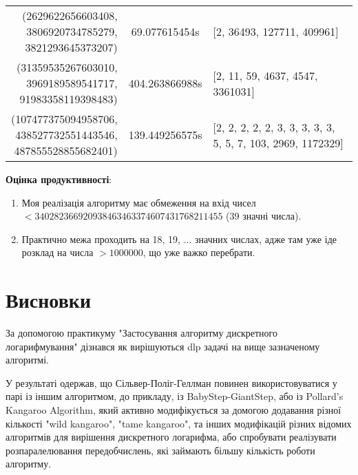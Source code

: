 {\begin{tabularx}{\textwidth}{||r|c|l||}
\substack{(2629622656603408,\\ 3806920734785279,\\ 3821293645373207)} & 69.077615454s & [2, 36493, 127711, 409961]\\
\substack{(31359535267603010,\\ 3969189589541717,\\ 91983358119398483)} & 404.263866988s & [2, 11, 59, 4637, 4547, 3361031]\\
\substack{
(107477375094958706,\\ 438527732551443546,\\ 487855528855682401)} & 139.449256575s & [2, 2, 2, 2, 2, 3, 3, 3, 3, 3, 5, 5, 7, 103, 2969, 1172329]\\

\end{tabularx}}

\vspace{5mm}
\textbf{Оцінка продуктивності}:
\begin{enumerate}
\item Моя реалізація алгоритму має обмеження на вхід чисел $<340282366920938463463374607431768211455$ (39 значні числа).
\item Практично межа проходить на 18, 19, ... значних числах, адже там уже іде розклад на числа $>1000000$, що уже важко перебрати.
\end{enumerate} 

\section{Висновки}
За допомогою практикуму "Застосування алгоритму дискретного логарифмування" дізнався як вирішуються dlp задачі на вище зазначеному алгоритмі.

У результаті одержав, що Сільвер-Поліг-Геллман повинен використовуватися у парі із іншим алгоритмом, до прикладу, із BabyStep-GiantStep, або із Pollard's Kangaroo Algorithm, який активно модифікується за домогою додавання різної кількості "wild kangaroo", "tame kangaroo", та інших модифікацій різних відомих алгоритмів для вирішення дискретного логарифма, або спробувати реалізувати розпаралелювання передобчислень, які займають більшу кількість роботи алгоритму. 

	




